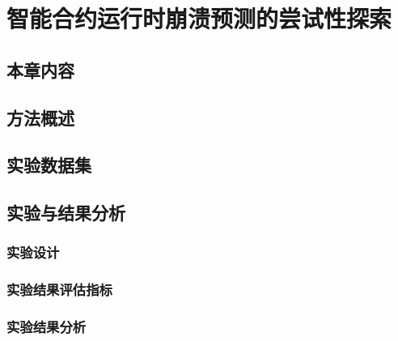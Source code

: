 \chapter{智能合约运行时崩溃预测的尝试性探索}
\section{本章内容}
\section{方法概述}
\section{实验数据集}
\section{实验与结果分析}
\subsection{实验设计}
\subsection{实验结果评估指标}
\subsection{实验结果分析}
